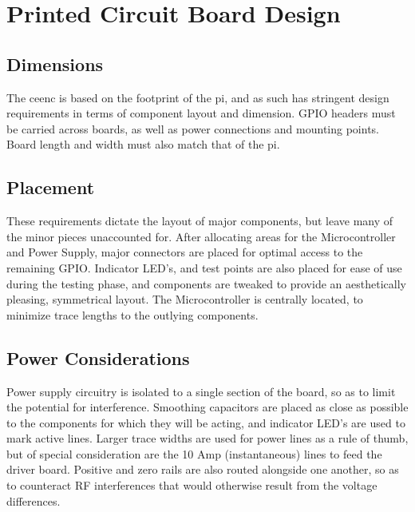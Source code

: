 \section{Printed Circuit Board Design}
\subsection{Dimensions}
The \gls{ceenc} is based on the footprint of the \gls{pi}, and as such has stringent design requirements in terms of component layout and dimension.
GPIO headers must be carried across boards, as well as power connections and mounting points. Board length and width must also match that of the \gls{pi}. 

\subsection{Placement}
These requirements dictate the layout of major components, but leave many of the minor pieces unaccounted for.
After allocating areas for the Microcontroller and Power Supply, major connectors are placed for optimal access to the remaining GPIO.
Indicator LED’s, and test points are also placed for ease of use during the testing phase, and components are tweaked to provide an aesthetically pleasing, symmetrical layout.
The Microcontroller is centrally located, to minimize trace lengths to the outlying components.

\subsection{Power Considerations}
Power supply circuitry is isolated to a single section of the board, so as to limit the potential for interference.
Smoothing capacitors are placed as close as possible to the components for which they will be acting, and indicator LED’s are used to mark active lines.
Larger trace widths are used for power lines as a rule of thumb, but of special consideration are the 10 Amp (instantaneous) lines to feed the driver board.
Positive and zero rails are also routed alongside one another, so as to counteract RF interferences that would otherwise result from the voltage differences.

